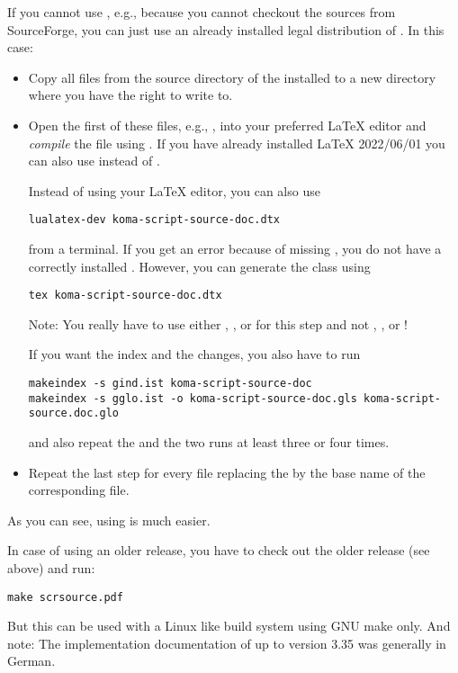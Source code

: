 \documentclass[USenglish]{koma-script-source-doc}
\begin{document}
If you cannot use , e.g., because you cannot checkout the
sources from SourceForge, you can just use an already installed legal
distribution of \KOMAScript. In this case:
\begin{itemize}
\item Copy all  files from the source directory of the installed
  \KOMAScript{} to a new directory where you have the right to write to.
\item Open the first of these files, e.g., ,
  into your preferred \LaTeX{} editor and \emph{compile} the file using
  . If you have already installed \LaTeX{} 2022/06/01 you
  can also use  instead of .

  Instead of using your \LaTeX{} editor, you can also use
\begin{verbatim}
lualatex-dev koma-script-source-doc.dtx
\end{verbatim}
  from a terminal. If you get an error because of missing
  , you do not have a correctly installed
  \KOMAScript. However, you can generate the class using
\begin{verbatim}
tex koma-script-source-doc.dtx
\end{verbatim}
  Note: You really have to use either , , 
  or  for this step and not , ,
   or !

  If you want the index and the changes, you also have to run
\begin{verbatim}
makeindex -s gind.ist koma-script-source-doc
makeindex -s gglo.ist -o koma-script-source-doc.gls koma-script-source.doc.glo
\end{verbatim}
  and also repeat the  and the two  runs at
  least three or four times.
\item Repeat the last step for every  file replacing the
   by the base name of the corresponding
   file.
\end{itemize}

As you can see, using  is much easier.


In case of using an older \KOMAScript{} release, you have to check out the
older release (see above) and run:
\begin{verbatim}
make scrsource.pdf
\end{verbatim}
But this can be used with a Linux like build system using GNU make only. And
note: The implementation documentation of \KOMAScript{} up to version 3.35 was
generally in German.
\end{document}
